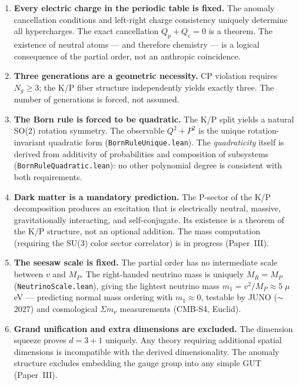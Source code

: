 \documentclass[11pt,letterpaper]{article}
\begin{document}
\begin{enumerate}[label=(\roman*)]
  \item \textbf{Every electric charge in the periodic table is
    fixed.}  The anomaly cancellation conditions and left-right
    charge consistency uniquely determine all hypercharges.  The
    exact cancellation $Q_p + Q_e = 0$ is a theorem.  The existence
    of neutral atoms --- and therefore chemistry --- is a logical
    consequence of the partial order, not an anthropic coincidence.

  \item \textbf{Three generations are a geometric necessity.}
    CP violation requires $N_g \geq 3$; the K/P fiber structure
    independently yields exactly three.  The number of generations
    is forced, not assumed.

  \item \textbf{The Born rule is forced to be quadratic.}
    The K/P split yields a natural SO(2) rotation symmetry.  The
    observable $Q^2 + P^2$ is the unique rotation-invariant
    quadratic form (\texttt{BornRuleUnique.lean}).  The
    \emph{quadraticity} itself is derived from additivity of
    probabilities and composition of subsystems
    (\texttt{BornRuleQuadratic.lean}): no other polynomial
    degree is consistent with both requirements.

  \item \textbf{Dark matter is a mandatory prediction.}
    The P-sector of the K/P decomposition produces an excitation
    that is electrically neutral, massive, gravitationally
    interacting, and self-conjugate.  Its existence is a theorem of
    the K/P structure, not an optional addition.  The mass
    computation (requiring the SU(3) color sector correlator) is in
    progress (Paper~III).

  \item \textbf{The seesaw scale is fixed.}  The partial order has
    no intermediate scale between $v$ and $M_P$.  The right-handed
    neutrino mass is uniquely $M_R = M_P$
    (\texttt{NeutrinoScale.lean}), giving the lightest neutrino mass
    $m_1 = v^2/M_P \approx 5\;\mu$eV --- predicting normal mass
    ordering with $m_1 \approx 0$, testable by JUNO ($\sim$2027)
    and cosmological $\Sigma m_\nu$ measurements (CMB-S4, Euclid).

  \item \textbf{Grand unification and extra dimensions are excluded.}
    The dimension squeeze proves $d = 3{+}1$ uniquely.  Any theory
    requiring additional spatial dimensions is incompatible with the
    derived dimensionality.  The anomaly structure excludes embedding
    the gauge group into any simple GUT (Paper~III).


\end{enumerate}
\end{document}
